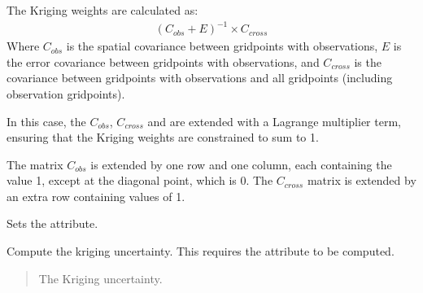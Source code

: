 \documentclass[letterpaper,10pt,english]{sphinxmanual}
\begin{document}
\begin{fulllineitems}
\begin{fulllineitems}
\sphinxAtStartPar
The Kriging weights are calculated as:
\begin{equation*}
\begin{split}(C_{obs} + E)^{-1} \times C_{cross}\end{split}
\end{equation*}
\sphinxAtStartPar
Where \(C_{obs}\) is the spatial covariance between grid\sphinxhyphen{}points
with observations, \(E\) is the error covariance between grid\sphinxhyphen{}points
with observations, and \(C_{cross}\) is the covariance between
grid\sphinxhyphen{}points with observations and all grid\sphinxhyphen{}points (including observation
grid\sphinxhyphen{}points).

\sphinxAtStartPar
In this case, the \(C_{obs}\), \(C_{cross}\) and are extended
with a Lagrange multiplier term, ensuring that the Kriging weights are
constrained to sum to 1.

\sphinxAtStartPar
The matrix \(C_{obs}\) is extended by one row and one column, each
containing the value 1, except at the diagonal point, which is 0. The
\(C_{cross}\) matrix is extended by an extra row containing values
of 1.

\sphinxAtStartPar
Sets the  attribute.
\begin{quote}\begin{description}
\sphinxAtStartPar
{}

\end{description}\end{quote}

\end{fulllineitems}


\begin{fulllineitems}
\label{\detokenize{kriging:glomar_gridding.kriging.OrdinaryKriging.get_uncertainty}}
\pysigstartsignatures
\pysiglinewithargsret
{}
{}
{}
\pysigstopsignatures
\sphinxAtStartPar
Compute the kriging uncertainty. This requires the attribute
 to be computed.
\begin{quote}\begin{description}
\sphinxAtStartPar
{} \textendash{} The Kriging uncertainty.


\end{description}
\end{quote}
\end{fulllineitems}
\end{fulllineitems}
\end{document}

